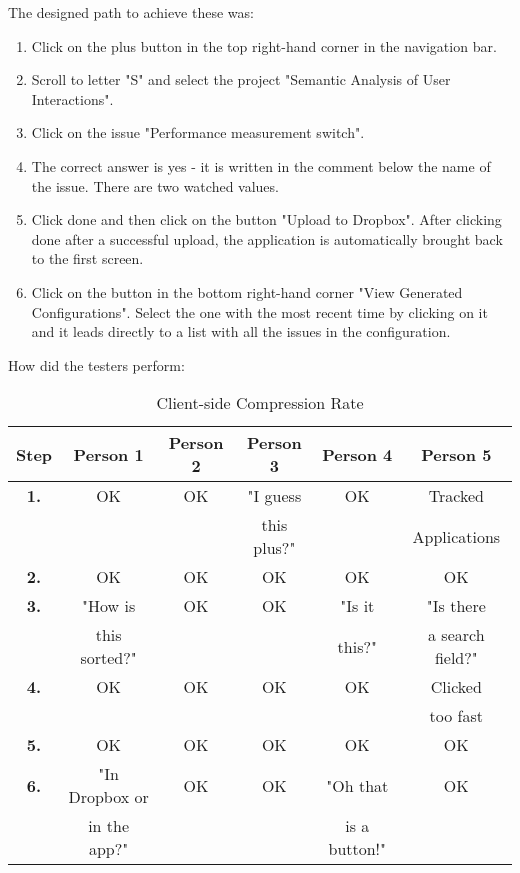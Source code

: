 The designed path to achieve these was:

\begin{enumerate}
	\item Click on the plus button in the top right-hand corner in the navigation bar.
	\item Scroll to letter "S" and select the project "Semantic Analysis of User Interactions".
	\item Click on the issue "Performance measurement switch".
	\item The correct answer is yes - it is written in the comment below the name of the issue. There are two watched values.
	\item Click done and then click on the button "Upload to Dropbox". After clicking done after a successful upload, the application is automatically brought back to the first screen.
	\item Click on the button in the bottom right-hand corner "View Generated Configurations". Select the one with the most recent time by clicking on it and it leads directly to a list with all the issues in the configuration.
\end{enumerate}

\newpage

How did the testers perform:

\begin{table}[!ht]
\begin{center}
\begin{tabular}{|c|c|c|c|c|c|}
\hline
\textbf{Step} & \textbf{Person 1} & \textbf{Person 2} & \textbf{Person 3} & \textbf{Person 4} & \textbf{Person 5} \\
\hline
\textbf{1.} & OK & OK & "I guess & OK & Tracked  \\
& & & this plus?" & & Applications \\
\hline
\textbf{2.} & OK & OK & OK & OK & OK \\
\hline
\textbf{3.} & "How is  & OK & OK & "Is it & "Is there \\
& this sorted?" & & & this?" & a search field?" \\
\hline
\textbf{4.} & OK & OK & OK & OK & Clicked \\
& & & & & too fast \\
\hline
\textbf{5.} & OK & OK & OK & OK & OK \\
\hline
\textbf{6.} & "In Dropbox or & OK & OK & "Oh that & OK \\
& in the app?" & & & is a button!" & \\
\hline
\end{tabular}
\end{center}
\caption{Client-side Compression Rate}
\label{tab:ex_db}
\end{table}

